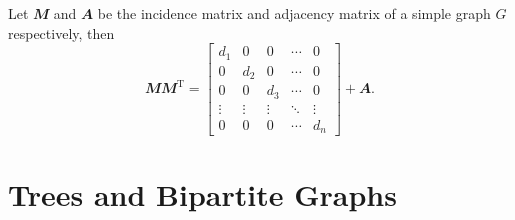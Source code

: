 \documentclass[math, code]{amznotes}
\theoremstyle{remark}
\begin{document}
\begin{probox}{}{}
    Let $\mathbfit{M}$ and $\mathbfit{A}$ be the incidence matrix and adjacency matrix of a simple graph $G$ respectively, then
    \begin{equation*}
        \mathbfit{M}\mathbfit{M}^{\mathrm{T}} = \begin{bmatrix}
            d_1 & 0 & 0 & \cdots & 0 \\
            0 & d_2 & 0 & \cdots & 0 \\
            0 & 0 & d_3 & \cdots & 0 \\
            \vdots & \vdots & \vdots & \ddots & \vdots \\
            0 & 0 & 0 & \cdots & d_n
        \end{bmatrix} + \mathbfit{A}.
    \end{equation*}
\end{probox}


\chapter{Trees and Bipartite Graphs}
\end{document}
